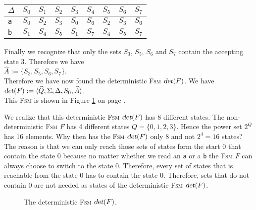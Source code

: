 \begin{center}
\begin{tabular}[t]{|l||c|c|c|c|c|c|c|c|}
\hline
$\Delta$ & $S_0$ & $S_1$ & $S_2$ & $S_3$ & $S_4$ & $S_5$ & $S_6$ & $S_7$ \\
\hline
\hline
\texttt{a} & $S_0$ & $S_2$ & $S_3$ & $S_0$ & $S_6$ & $S_2$ & $S_3$ & $S_6$ \\
\hline
\texttt{b} & $S_1$ & $S_4$ & $S_5$ & $S_1$ & $S_7$ & $S_4$ & $S_5$ & $S_7$ \\
\hline
\end{tabular}
\end{center}
Finally we recognize that only the sets  $S_3$, $S_5$, $S_6$ and $S_7$ contain the accepting state
 $3$.  Therefore we have
\\[0.2cm]
\hspace*{1.3cm}
$\widehat{A} := \{ S_3, S_5, S_6, S_7 \}$.
\\[0.2cm]
Therefore we have now found the deterministic \textsc{Fsm} $\textsl{det}(F)$. We have
\\[0.2cm]
\hspace*{1.3cm}
$\textsl{det}(F) := \langle \widehat{Q}, \Sigma, \Delta, S_0, \widehat{A}\rangle$.
\\[0.2cm]
This \textsc{Fsm} is shown in Figure \ref{fig:a2.eps} on page \pageref{fig:a2.eps}.

We realize that this deterministic \textsc{Fsm} $\textsl{det}(F)$ has 8 different states. 
The non-deterministic \textsc{Fsm} $F$ has 4 different states
 $Q = \{ 0, 1, 2, 3 \}$.  Hence the power set $2^Q$ has 16 elements.
Why then has the \textsc{Fsm} $\textsl{det}(F)$ only 8 and not $2^4 = 16$ states?
The reason is that we can only reach those sets of states form the start $0$
that contain the state $0$ because no matter whether we read an \texttt{a} or a \texttt{b}
the \textsc{Fsm} $F$ can always choose to switch to the state $0$.  Therefore, every set of states that is
reachable from the state $0$ has to contain the state $0$.  Therefore, 
sets that do not contain $0$ are not needed as states of the deterministic \textsc{Fsm}
$\textsl{det}(F)$.



\begin{figure}[!ht]
  \centering
     \vspace*{0.5cm}
  \caption{The deterministic \textsc{Fsm} $\textsl{det}(F)$.}
  \label{fig:a2.eps}
\end{figure}


